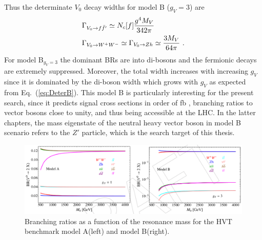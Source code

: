 Thus the determinate $V_{0}$ decay widths for model B ($g_{V}=3$) are
\begin{align}
  &\Gamma_{V_{0}\rightarrow f\bar{f}'}\simeq N_{c}[f]\frac{g^{4}M_{V}}{342\pi}\nonumber\\
  &\Gamma_{V_{0}\rightarrow W^{+}W^{-}}\simeq \Gamma_{V_{0}\rightarrow Zh}\simeq \frac{3M_{V}}{64\pi}\textup{ .}
\end{align}
For model B$_{g_{V}=3}$ the dominant BRs are into di-bosons and the fermionic decays are extremely suppressed. Moreover, the total width increases with increasing $g_{V}$ since it is dominated by the di-boson width which grows with $g_{V}$ as expected from Eq.~({\ref{eq:DeterB}}). This model B is particularly interesting for the present search, since it predicts signal cross sections in order of fb\cite{HVT} \cite{CMS_AN_2015-186}, branching ratios to vector bosons close to unity, and thus being accessible at the LHC. In the latter chapters, the mass eigenstate of the neutral heavy vector boson in model B scenario refers to the $Z'$ particle, which is the search target of this thesis.\\
\begin{figure}[h]
  \begin{center}
    \includegraphics[width=\textwidth]{figure/CH1/BRs_modelAvsB.png}
  \end{center}
  \caption{\label{fig:BRs_AvsB}Branching ratios as a function of the resonance mass for the HVT benchmark model A(left) and model B(right).}
\end{figure}
